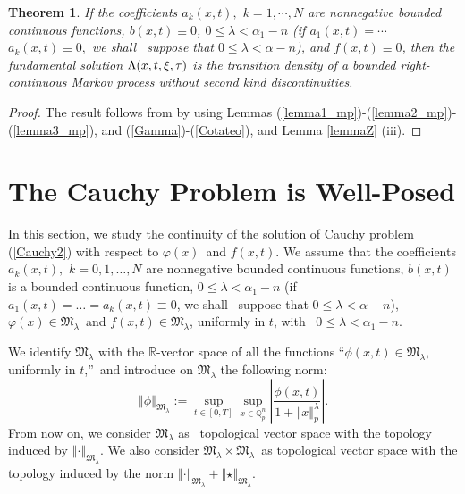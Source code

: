\documentclass{amsart}\usepackage{amsfonts}
\newtheorem{theorem}{Theorem}[section]
\theoremstyle{plain}
\numberwithin{equation}{section}
\begin{document}
\begin{theorem}
\label{Thm2}If the coefficients $a_{k}(x,t),$ $k=1,\cdots,N$ are nonnegative
bounded continuous functions, $b(x,t)\equiv0$, $0\leq\lambda<\alpha_{1}-n$ (if
$a_{1}(x,t)=\cdots$ $a_{k}(x,t)\equiv0,$ we shall \ suppose that $0\leq
\lambda<\alpha-n$), and $f(x,t)\equiv0$, then the fundamental solution
${\LARGE \Lambda}(x,t,\xi,\tau)$ is the transition density of a bounded
right-continuous Markov process without second kind discontinuities.
\end{theorem}

\begin{proof}
The result follows from \cite[Theorem 3.6]{Dyn} by using Lemmas
(\ref{lemma1_mp})-(\ref{lemma2_mp})-(\ref{lemma3_mp}), and (\ref{Gamma})-(\ref{Cotateo}), and Lemma \ref{lemmaZ} (iii).
\end{proof}

\section{The Cauchy Problem is Well-Posed}

In this section, we study the continuity of the solution of Cauchy problem
(\ref{Cauchy2}) with respect to $\varphi\left(  x\right)  $\ and $f\left(
x,t\right)  $. We assume that the coefficients $a_{k}(x,t),$ $k=0,1,\ldots,N$
are nonnegative bounded continuous functions, $b(x,t)$ is a bounded continuous
function, $0\leq\lambda<\alpha_{1}-n$ (if $a_{1}(x,t)=\ldots=a_{k}(x,t)\equiv0$, we shall \ suppose that $0\leq\lambda<\alpha-n$),
$\varphi\left(  x\right)  \in\mathfrak{M}_{\lambda}$\ and $f\left(
x,t\right)  \in\mathfrak{M}_{\lambda}$, uniformly in $t$, with \ $0\leq
\lambda<\alpha_{1}-n$.

We identify $\mathfrak{M}_{\lambda}$ with the $\mathbb{R}$-vector space of all
the functions \textquotedblleft$\phi\left(  x,t\right)  \in\mathfrak{M}_{\lambda}$, uniformly in $t$,\textquotedblright\ and introduce on
$\mathfrak{M}_{\lambda}$ the following norm:\[
\left\Vert \phi\right\Vert _{\mathfrak{M}_{\lambda}}:=\sup_{t\in\left[
0,T\right]  }\sup_{x\in\mathbb{Q}_{p}^{n}}\left\vert \frac{\phi\left(
x,t\right)  }{1+\left\Vert x\right\Vert _{p}^{\lambda}}\right\vert .
\]
From now on, we consider $\mathfrak{M}_{\lambda}$ as \ topological vector
space with the topology induced by $\left\Vert \cdot\right\Vert _{\mathfrak{M}_{\lambda}}$. We also consider $\mathfrak{M}_{\lambda}\times\mathfrak{M}_{\lambda}$\ as topological vector space with the topology induced by the norm
$\left\Vert \cdot\right\Vert _{\mathfrak{M}_{\lambda}}+\left\Vert
\star\right\Vert _{\mathfrak{M}_{\lambda}}$.
\end{document}
